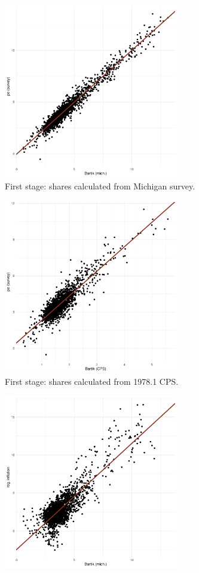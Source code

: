 \documentclass[12pt]{article}
\begin{document}
\begin{figure}
\centering
\caption{Inflation expectations and inflation: reduced-form estimates.}\label{fig:redform}
\begin{subfigure}[t]{0.475\textwidth}
\centering
\includegraphics[width = 3in, height =3in]{figs/firststage}
%
\caption{First stage: shares calculated from Michigan survey.  }\label{subfig:redform:stage1:michigan}
\end{subfigure}
\quad
\begin{subfigure}[t]{0.475\textwidth}
\centering
\includegraphics[width =3in, height =3in]{figs/firststage_cps}
%
\caption{First stage: shares calculated from 1978.1 CPS.}\label{subfig:redform:stage1:cps}
\end{subfigure}
\vfill
\begin{subfigure}[t]{0.475\textwidth}
\centering
\includegraphics[width =3in, height =3in]{figs/redform}

\end{subfigure}
\end{figure}
\end{document}
